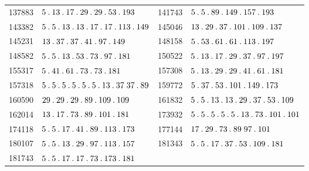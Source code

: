 \begin{longtable}{@{}r|l@{\qquad}r|l@{}}
137883 & $5\pdot 13\pdot 17\pdot 29\pdot 29\pdot 53\pdot 193$ & 141743 & $5\pdot 5\pdot 89\pdot 149\pdot 157\pdot 193$\\
143382 & $5\pdot 5\pdot 13\pdot 13\pdot 17\pdot 17\pdot 113\pdot 149$ & 145046 & $13\pdot 29\pdot 37\pdot 101\pdot 109\pdot 137$\\
145231 & $13\pdot 37\pdot 37\pdot 41\pdot 97\pdot 149$ & 148158 & $5\pdot 53\pdot 61\pdot 61\pdot 113\pdot 197$\\
148582 & $5\pdot 5\pdot 13\pdot 53\pdot 73\pdot 97\pdot 181$ & 150522 & $5\pdot 13\pdot 17\pdot 29\pdot 37\pdot 97\pdot 197$\\
155317 & $5\pdot 41\pdot 61\pdot 73\pdot 73\pdot 181$ & 157308 & $5\pdot 13\pdot 29\pdot 29\pdot 41\pdot 61\pdot 181$\\
157318 & $5\pdot 5\pdot 5\pdot 5\pdot 5\pdot 5\pdot 13\pdot 37\;37\pdot 89$ & 159772 & $5\pdot 37\pdot 53\pdot 101\pdot 149\pdot 173$\\
160590 & $29\pdot 29\pdot 29\pdot 89\pdot 109\pdot 109$ & 161832 & $5\pdot 5\pdot 13\pdot 13\pdot 29\pdot 37\pdot 53\pdot 109$\\
162014 & $13\pdot 17\pdot 73\pdot 89\pdot 101\pdot 181$ & 173932 & $5\pdot 5\pdot 5\pdot 5\pdot 5\pdot 13\pdot 73\pdot 101\pdot 101$\\
174118 & $5\pdot 5\pdot 17\pdot 41\pdot 89\pdot 113\pdot 173$ & 177144 & $17\pdot 29\pdot 73\pdot 89\;97\pdot 101$\\
180107 & $5\pdot 5\pdot 13\pdot 29\pdot 97\pdot 113\pdot 157$ & 181343 & $5\pdot 5\pdot 17\pdot 37\pdot 53\pdot 109\pdot 181$\\
181743 & $5\pdot 5\pdot 17\pdot 17\pdot 73\pdot 173\pdot 181$ &  & \\
\end{longtable}\endgroup
